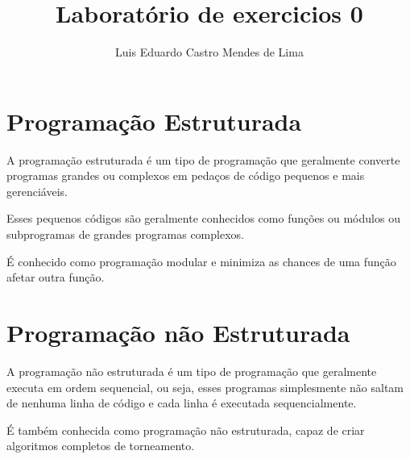 \documentclass[12pt,a4paper]{abntex2}
\title{Laboratório de exercicios 0}
\author{Luis Eduardo Castro Mendes de Lima}
\begin{document}
\maketitle

\section{Programação Estruturada}

A programação estruturada é um tipo de programação que geralmente converte programas grandes ou
complexos em pedaços de código pequenos e mais gerenciáveis.

Esses pequenos códigos são geralmente conhecidos como funções ou módulos ou subprogramas de
grandes programas complexos.

É conhecido como programação modular e minimiza as chances de uma função afetar outra função.


\section{Programação não Estruturada}

 A programação não estruturada é um tipo de programação que geralmente executa em ordem
 sequencial, ou seja, esses programas simplesmente não saltam de nenhuma linha de código e
 cada linha é executada sequencialmente.

 É também conhecida como programação não estruturada, capaz de criar algoritmos completos de
 torneamento.\\
\end{document}
